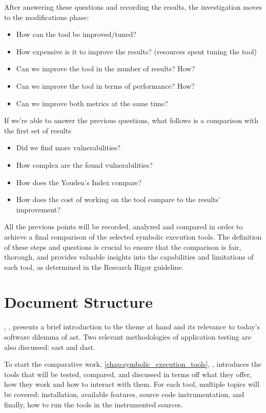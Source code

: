 After answering these questions and recording the results, the investigation moves to the modifications phase:
\begin{itemize}
    \item How can the tool be improved/tuned?
    \item How expensive is it to improve the results? (resources spent tuning the tool)
    \item Can we improve the tool in the number of results? How?
    \item Can we improve the tool in terms of performance? How?
    \item Can we improve both metrics at the same time?
\end{itemize}

If we're able to answer the previous questions, what follows is a comparison with the first set of results
\begin{itemize}
    \item Did we find more vulnerabilities?
    \item How complex are the found vulnerabilities?
    \item How does the Youden's Index compare?
    \item How does the cost of working on the tool compare to the results' improvement?
\end{itemize}

All the previous points will be recorded, analyzed and compared in order to achieve a final comparison of the selected symbolic execution tools. The definition of these steps and questions is crucial to ensure that the comparison is fair, thorough, and provides valuable insights into the capabilities and limitations of each tool, as determined in the Research Rigor guideline.

\section{Document Structure}

, , presents a brief introduction to the theme at hand and its relevance to today's software dilemma of \acrlong{ast}. Two relevant methodologies of application testing are also discussed: \acrshort{sast} and \acrshort{dast}.

To start the comparative work, \cref{chap:symbolic_execution_tools}, , introduces the tools that will be tested, compared, and discussed in terms off what they offer, how they work and how to interact with them. For each tool, multiple topics will be covered: installation, available features, source code instrumentation, and finally, how to run the tools in the instrumented sources.

